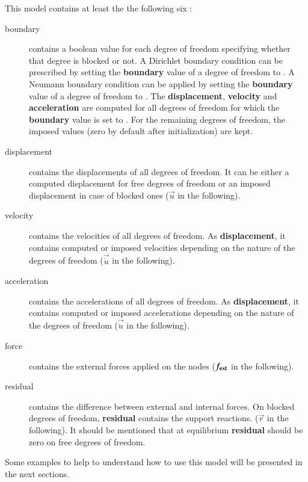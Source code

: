 This model contains at least the the following six :
\begin{description}
\item[boundary] contains a  boolean value for each degree  of freedom specifying
  whether that degree  is blocked or not. A Dirichlet  boundary condition can be
  prescribed by  setting the \textbf{boundary} value  of a degree  of freedom to
  .   A Neumann  boundary condition  can  be applied  by setting  the
  \textbf{boundary}  value  of  a   degree  of  freedom  to  .   The
  \textbf{displacement},   \textbf{velocity}   and   \textbf{acceleration}   are
  computed for all  degrees of freedom for which  the \textbf{boundary} value is
  set to . For the  remaining degrees of freedom, the imposed values
  (zero by default  after initialization) are kept. 
\item[displacement] contains the displacements of all degrees of freedom. It can
  be either  a computed displacement for  free degrees of freedom  or an imposed
  displacement in case of blocked ones ($\vec{u}$ in the following).
\item[velocity]  contains  the  velocities   of  all  degrees  of  freedom.   As
  \textbf{displacement}, it contains computed or imposed velocities depending on
  the nature of the degrees of freedom ($\vec{\dot{u}}$ in the following).
\item[acceleration]  contains the accelerations  of all  degrees of  freedom. As
  \textbf{displacement}, it contains computed or imposed accelerations depending
  on the nature of the degrees of freedom ($\vec{\ddot{u}}$ in the following).
\item[force]   contains    the   external   forces   applied    on   the   nodes
  ($\boldsymbol{f_{{\mathrm{ext}}}}$ in the following).
\item[residual] contains the difference between external and internal forces. On
  blocked degrees of freedom,  \textbf{residual} contains the support reactions.
  ($\vec{r}$  in the  following).  It  should be  mentioned that  at equilibrium
  \textbf{residual} should be zero on free degrees of freedom.
\end{description}

Some examples to help to understand  how to use this model will be presented
in the next sections.

